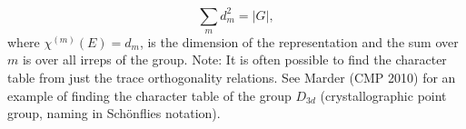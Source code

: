 \documentclass{article}
\begin{document}
	\begin{equation}
		\sum_m d_m ^2 = |G|,
	\end{equation}
	where $\chi^{(m)}(E) = d_m$, is the dimension of the representation and the sum over $m$ is over all irreps of the group. Note: It is often possible to find the character table from just the trace orthogonality relations. See Marder (CMP 2010) for an example of finding the character table of the group $D_{3d}$ (crystallographic point group, naming in Sch\"{o}nflies notation).
	
	
	
	
	
	
	
	
	
\end{document}
